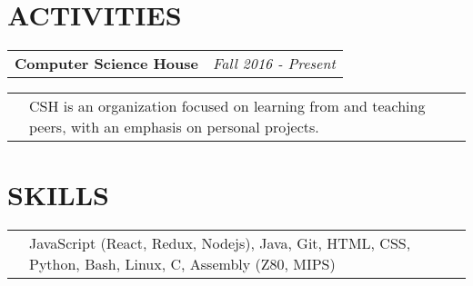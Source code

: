 \documentclass[11pt]{article}
\begin{document}
\section*{ACTIVITIES}
\begin{tabularx}{\textwidth}{X r}
	\quad\textbf{Computer Science House} & \textit{Fall 2016 - Present}
\end{tabularx}
\begin{tabularx}{\textwidth}{l X}
	\quad\quad & CSH is an organization focused on learning from and teaching peers, with an emphasis on personal projects.
\end{tabularx}

\section*{SKILLS}
\begin{tabularx}{\textwidth}{l X}
	\quad\quad &  JavaScript (React, Redux, Nodejs), Java, Git, HTML, CSS, Python, Bash, Linux, C, Assembly (Z80, MIPS)
\end{tabularx}
\end{document}
